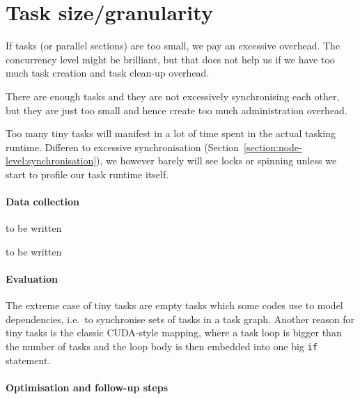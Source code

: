 \section{Task size/granularity}
\label{section:node-level:task-size}

If tasks (or parallel sections) are too small, we pay an excessive overhead.
The concurrency level might be brilliant, but that does not help us if we have too much task creation and task clean-up overhead.

\begin{hypothesis}
 There are enough tasks and they are not excessively synchronising each other, but they are just too small and hence create too much administration overhead.
\end{hypothesis}


\noindent
Too many tiny tasks will manifest in a lot of time spent in the actual tasking runtime.
Differen to excessive synchronisation (Section~\ref{section:node-level:synchronisation}), we however barely will see locks or spinning unless we start to profile our task runtime itself.

\paragraph{Data collection}

\begin{instructions}{\otter}
 to be written
\end{instructions}


\begin{instructions}{\vtune}
 to be written
\end{instructions}


\paragraph{Evaluation}

The extreme case of tiny tasks are empty tasks which some codes use to model dependencies, i.e.~to synchronise sets of tasks in a task graph.
Another reason for tiny tasks is the classic CUDA-style mapping, where a task loop is bigger than the number of tasks and the loop body is then embedded into one big \texttt{if} statement.



\paragraph{Optimisation and follow-up steps}

